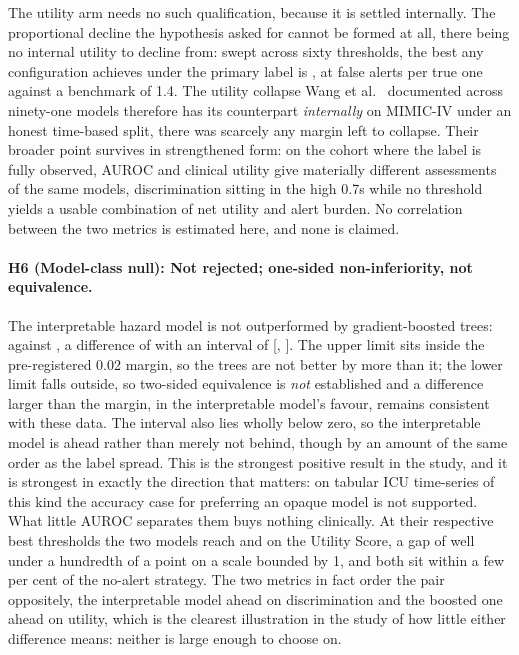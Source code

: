 The utility arm needs no such qualification, because it is settled internally.
The proportional decline the hypothesis asked for cannot be formed at all,
there being no internal utility to decline from: swept across sixty thresholds,
the best any configuration achieves under the primary label is
\pcUtilityMaxGbtB{}, at \pcUtilityOptBurdenGbtB{} false alerts per true one
against a benchmark of 1.4. The utility collapse Wang et al.\
\cite{wang2025srpm} documented across ninety-one models therefore has its
counterpart \emph{internally} on MIMIC-IV under an honest time-based split,
there was scarcely any margin left to collapse. Their broader point survives in
strengthened form: on the cohort where the label is fully observed, AUROC and
clinical utility give materially different assessments of the same models,
discrimination sitting in the high 0.7s while no threshold yields a usable
combination of net utility and alert burden. No correlation between the two
metrics is estimated here, and none is claimed.

\paragraph{H6 (Model-class null): Not rejected; one-sided non-inferiority, not equivalence.}
The interpretable hazard model is not outperformed by gradient-boosted trees:
\pcAurocPrimaryB{} against \pcAurocGbtB, a difference of \pcHSixEst{} with an
interval of [\pcHSixCiLo, \pcHSixCiHi]. The upper limit sits inside the
pre-registered 0.02 margin, so the trees are not better by more than it; the
lower limit falls outside, so two-sided equivalence is \emph{not} established
and a difference larger than the margin, in the interpretable model's favour,
remains consistent with these data. The interval also lies wholly below zero,
so the interpretable model is ahead rather than merely not behind, though by an
amount of the same order as the label spread. This is the strongest positive
result in the study, and it is strongest in exactly the direction that matters:
on tabular ICU time-series of this kind the accuracy case for preferring an
opaque model is not supported. What little AUROC separates them buys nothing
clinically. At their respective best thresholds the two models reach
\pcUtilityMaxGbtB{} and \pcUtilityMaxPrimaryB{} on the Utility Score, a gap of
well under a hundredth of a point on a scale bounded by 1, and both sit within
a few per cent of the no-alert strategy. The two metrics in fact order the pair
oppositely, the interpretable model ahead on discrimination and the boosted one
ahead on utility, which is the clearest illustration in the study of how little
either difference means: neither is large enough to choose on.


